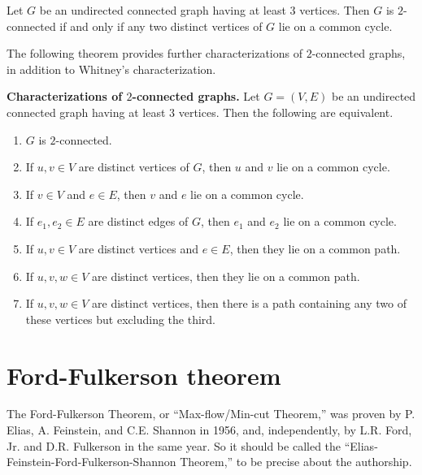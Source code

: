 \begin{corollary}
Let $G$ be an undirected connected graph having at least $3$
vertices. Then $G$ is $2$-connected if and only if any two distinct
vertices of $G$ lie on a common cycle.
\end{corollary}

The following theorem provides further characterizations of
$2$-connected graphs, in addition to Whitney's characterization.

\begin{theorem}
\label{thm:distance_connectivity:characterization_2_connected_graphs}
\textbf{Characterizations of $2$-connected graphs.}
Let $G = (V,E)$ be an undirected connected graph having at least $3$
vertices. Then the following are equivalent.
\begin{enumerate}
\item $G$ is $2$-connected.

\item If $u,v \in V$ are distinct vertices of $G$, then $u$ and $v$
  lie on a common cycle.

\item If $v \in V$ and $e \in E$, then $v$ and $e$ lie on a common
  cycle.

\item If $e_1, e_2 \in E$ are distinct edges of $G$, then $e_1$ and
  $e_2$ lie on a common cycle.

\item If $u,v \in V$ are distinct vertices and $e \in E$, then they
  lie on a common path.

\item If $u,v,w \in V$ are distinct vertices, then they lie on a
  common path.

\item If $u,v,w \in V$ are distinct vertices, then there is a path
  containing any two of these vertices but excluding the third.
\end{enumerate}
\end{theorem}



\section{Ford-Fulkerson theorem}

The Ford-Fulkerson Theorem, or ``Max-flow/Min-cut Theorem,''
was proven by P. Elias, A. Feinstein, and C.E. Shannon in 1956, and,
independently, by L.R. Ford, Jr.  and D.R. Fulkerson in the same year.
So it should be called the
``Elias-Feinstein-Ford-Fulkerson-Shannon Theorem,''
to be precise about the authorship.

